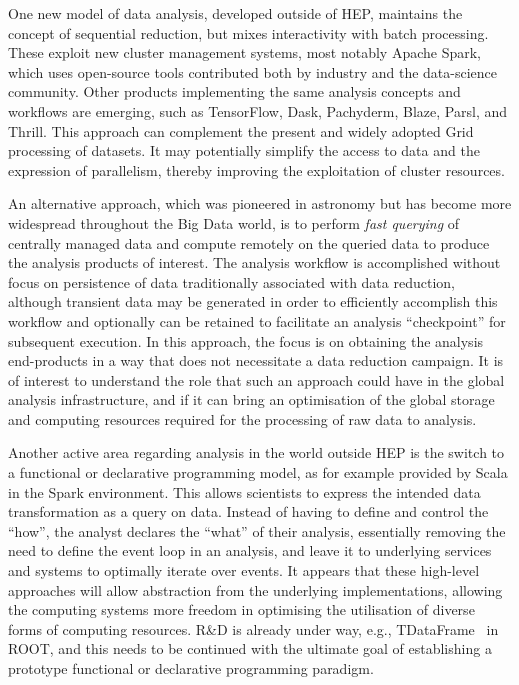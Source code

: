 \documentclass[12pt,a4paper]{article}
\begin{document}
One new model of data analysis, developed outside of HEP, maintains the
concept of sequential reduction, but mixes interactivity with
batch processing. These exploit new cluster management systems, most
notably Apache Spark, which uses open-source tools contributed both by
industry and the data-science community. Other products implementing the
same analysis concepts and workflows are emerging, such as TensorFlow,
Dask, Pachyderm, Blaze, Parsl, and Thrill. This approach can complement
the present and widely adopted Grid processing of datasets. It may
potentially simplify the access to data and the expression of
parallelism, thereby improving the exploitation of cluster resources.

An alternative approach, which was pioneered in astronomy but has become
more widespread throughout the Big Data world, is to perform \emph{fast
querying} of centrally managed data and compute remotely on the queried
data to produce the analysis products of interest. The analysis workflow
is accomplished without focus on persistence of data traditionally
associated with data reduction, although transient data may be generated
in order to efficiently accomplish this workflow and optionally can be
retained to facilitate an analysis ``checkpoint'' for subsequent
execution. In this approach, the focus is on obtaining the analysis
end-products in a way that does not necessitate a data reduction
campaign. It is of interest to understand the role
that such an approach could have in the global analysis infrastructure,
and if it can bring an optimisation of the global storage and computing
resources required for the processing of raw data to analysis.

Another active area regarding analysis in the world outside HEP is the
switch to a functional or declarative programming model, as for example
provided by Scala in the Spark environment. This allows scientists to
express the intended data transformation as a query on data. Instead of
having to define and control the ``how'', the analyst declares the
``what'' of their analysis, essentially removing the need to define the
event loop in an analysis, and leave it to underlying services and
systems to optimally iterate over events. It appears that these
high-level approaches will allow abstraction from the underlying
implementations, allowing the computing systems more freedom in
optimising the utilisation of diverse forms of computing resources. R\&D
is already under way, e.g., TDataFrame~\cite{TDataFrame} in ROOT, and
this needs to be continued with the ultimate goal of establishing a
prototype functional or declarative programming paradigm.
\end{document}
